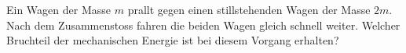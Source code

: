 Ein Wagen der Masse $m$ prallt gegen einen stillstehenden Wagen der Masse $2m$. Nach dem Zusammenstoss fahren die beiden Wagen gleich schnell weiter. Welcher Bruchteil der mechanischen Energie ist bei diesem Vorgang erhalten?
